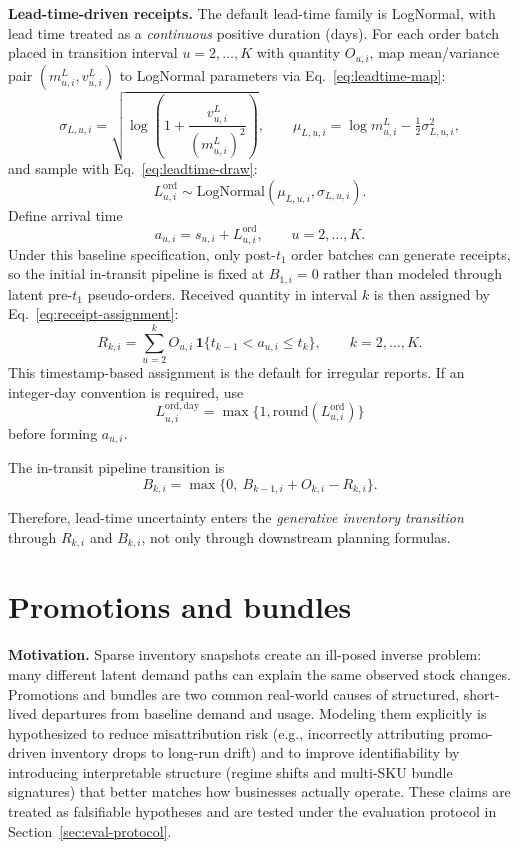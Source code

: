 \documentclass[11pt]{article}
\begin{document}
\textbf{Lead-time-driven receipts.} The default lead-time family is LogNormal, with lead time treated as a \emph{continuous} positive duration (days).
For each order batch placed in transition interval $u=2,\dots,K$ with quantity $O_{u,i}$, map mean/variance pair $(m^L_{u,i},v^L_{u,i})$ to LogNormal parameters via Eq.~\eqref{eq:leadtime-map}:
\begin{equation}\label{eq:leadtime-map}
  \sigma_{L,u,i}=\sqrt{\log\!\left(1+\frac{v^L_{u,i}}{(m^L_{u,i})^2}\right)},\qquad
  \mu_{L,u,i}=\log m^L_{u,i}-\tfrac{1}{2}\sigma^2_{L,u,i},
\end{equation}
and sample with Eq.~\eqref{eq:leadtime-draw}:
\begin{equation}\label{eq:leadtime-draw}
  L^{\mathrm{ord}}_{u,i} \sim \text{LogNormal}(\mu_{L,u,i},\sigma_{L,u,i}).
\end{equation}
Define arrival time
\[
  a_{u,i}=s_{u,i}+L^{\mathrm{ord}}_{u,i},\qquad u=2,\dots,K.
\]
Under this baseline specification, only post-$t_1$ order batches can generate receipts, so the initial in-transit pipeline is fixed at $B_{1,i}=0$ rather than modeled through latent pre-$t_1$ pseudo-orders.
Received quantity in interval $k$ is then assigned by Eq.~\eqref{eq:receipt-assignment}:
\begin{equation}\label{eq:receipt-assignment}
  R_{k,i}=\sum_{u=2}^{k} O_{u,i}\,\mathbf{1}\{t_{k-1}<a_{u,i}\le t_k\},\qquad k=2,\dots,K.
\end{equation}
This timestamp-based assignment is the default for irregular reports. If an integer-day convention is required, use
\[
  L^{\mathrm{ord,day}}_{u,i}=\max\{1,\mathrm{round}(L^{\mathrm{ord}}_{u,i})\}
\]
before forming $a_{u,i}$.

The in-transit pipeline transition is
\[
  B_{k,i}=\max\bigl\{0,\ B_{k-1,i}+O_{k,i}-R_{k,i}\bigr\}.
\]

Therefore, lead-time uncertainty enters the \emph{generative inventory transition} through $R_{k,i}$ and $B_{k,i}$, not only through downstream planning formulas.

\section{Promotions and bundles}

\textbf{Motivation.} Sparse inventory snapshots create an ill-posed inverse problem: many different latent demand paths can explain the same observed stock changes.
Promotions and bundles are two common real-world causes of structured, short-lived departures from baseline demand and usage.
Modeling them explicitly is hypothesized to reduce misattribution risk (e.g., incorrectly attributing promo-driven inventory drops to long-run drift) and to improve identifiability by introducing interpretable structure (regime shifts and multi-SKU bundle signatures) that better matches how businesses actually operate.
These claims are treated as falsifiable hypotheses and are tested under the evaluation protocol in Section~\ref{sec:eval-protocol}.
\end{document}
